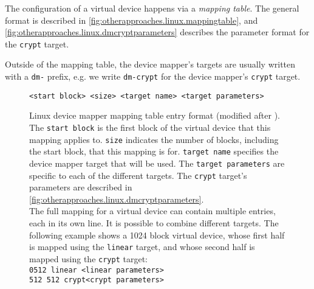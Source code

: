 The configuration of a virtual device happens via a \emph{mapping table}. The general format is described in \autoref{fig:otherapproaches.linux.mappingtable}, and \autoref{fig:otherapproaches.linux.dmcryptparameters} describes the parameter format for the \texttt{crypt} target.

Outside of the mapping table, the device mapper's targets are usually written with a \texttt{dm-} prefix, e.g. we write \texttt{dm-crypt} for the device mapper's \texttt{crypt} target.

\begin{figure}[htb!]
	\center
	\begin{mdframed}
		\texttt{<start block> <size> <target name> <target parameters>}
	\end{mdframed}
	\caption[
		Linux device mapper mapping table entry format
	]{
		Linux device mapper mapping table entry format (modified after \cite{Dmcrypt2020}). The \texttt{start block} is the first block of the virtual device that this mapping applies to. \texttt{size} indicates the number of blocks, including the start block, that this mapping is for. \texttt{target name} specifies the device mapper target that will be used. The \texttt{target parameters} are specific to each of the different targets. The \texttt{crypt} target's parameters are described in \autoref{fig:otherapproaches.linux.dmcryptparameters}.\\
		The full mapping for a virtual device can contain multiple entries, each in its own line. It is possible to combine different targets. The following example shows a 1024 block virtual device, whose first half is mapped using the \texttt{linear} target, and whose second half is mapped using the \texttt{crypt} target:\\
		\texttt{0\space\space\space{}512 linear <linear parameters>}\\
		\texttt{512 512 crypt\space\space{}<crypt parameters>}
	}
	\label{fig:otherapproaches.linux.mappingtable}
\end{figure}

